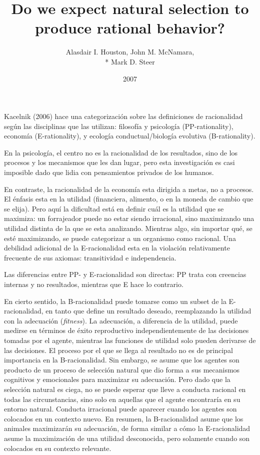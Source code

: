 \documentclass[a4paper,12pt]{article}
\title{Do we expect natural selection to produce rational behavior?}
\author{Alasdair I. Houston, John M. McNamara,\\*
	Mark D. Steer}
\date{2007}
\begin{document}
{\scshape\bfseries \maketitle}

Kacelnik (2006) hace una categorización sobre las definiciones de racionalidad según las disciplinas que las utilizan: filosofía y psicología (PP-rationality), economía (E-rationality), y ecología conductual/biología evolutiva (B-rationality).

En la psicología, el centro no es la racionalidad de los resultados, sino de los procesos y los mecanismos que les dan lugar, pero esta investigación es casi imposible dado que lidia con pensamientos privados de los humanos.

En contraste, la racionalidad de la economía esta dirigida a metas, no a procesos. El énfasis esta en la utilidad (financiera, alimento, o en la moneda de cambio que se elija). Pero aquí la dificultad está en definir cuál es la utilidad que se maximiza: un forrajeador puede no estar siendo irracional, sino maximizando una utilidad distinta de la que se esta analizando. Mientras algo, sin importar qué, se esté maximizando, se puede categorizar a un organismo como racional. Una debilidad adicional de la E-racionalidad esta en la violación relativamente frecuente de sus axiomas: transitividad e independencia.

Las diferencias entre PP- y E-racionalidad son directas: PP trata con creencias internas y no resultados, mientras que E hace lo contrario.

En cierto sentido, la B-racionalidad puede tomarse como un subset de la E-racionali\-dad, en tanto que define un resultado deseado, reemplazando la utilidad con la adecuación ({\slshape fitness}). La adecuación, a diferencia de la utilidad, puede medirse en términos de éxito reproductivo independientemente de las decisiones tomadas por el agente, mientras las funciones de utilidad solo pueden derivarse de las decisiones. El proceso por el que se llega al resultado no es de principal importancia en la B-racionalidad. Sin embargo, se asume que los agentes son producto de un proceso de selección natural que dio forma a sus mecanismos cognitivos y emocionales para maximizar su adecuación. Pero dado que la selección natural es ciega, no se puede esperar que lleve a conducta racional en todas las circunstancias, sino solo en aquellas que el agente encontraría en su entorno natural. Conducta irracional puede aparecer cuando los agentes son colocados en un contexto nuevo. En resumen, la B-racionalidad asume que los animales maximizarán su adecuación, de forma similar a cómo la E-racionalidad asume la maximización de una utilidad desconocida, pero solamente cuando son colocados en su contexto relevante.
\end{document}
